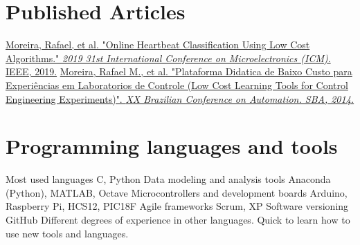 \documentclass[]{cv-style}          %
\begin{document}
\section{Published Articles}
\vspace{-0.3cm}
\begin{entrylist}
\entry
{}
{}
{\vspace{-0.4cm}}
{\href{https://doi.org/10.1109/ICM48031.2019.9021277}{Moreira, Rafael, et al. "Online Heartbeat Classification Using Low Cost Algorithms." \textit{2019 31st International Conference on Microelectronics (ICM)}. IEEE, 2019.}}
{}
\entry
{}
{}
{\vspace{-0.5cm}}
{\href{http://www.swge.inf.br/CBA2014/anais/PDF/1569927865.pdf}{Moreira, Rafael M., et al. "Plataforma Didatica de Baixo Custo para Experiências em Laboratorios de Controle (Low Cost Learning Tools for Control Engineering Experiments)". \textit{XX Brazilian Conference on Automation. SBA, 2014.}}}
{}
\end{entrylist}
{\vspace{-0.4cm}}

\section{Programming languages and tools}
\vspace{-0.3cm}
\begin{entrylist}
\entry
{}
{Most used languages}
{C, Python}
{\vspace{-0.5cm}}
\entry
{}
{Data modeling and analysis tools}
{Anaconda (Python), MATLAB, Octave}
{\vspace{-0.5cm}}
\entry
{}
{Microcontrollers and development boards}
{Arduino, Raspberry Pi, HCS12, PIC18F}
{\vspace{-0.5cm}}
\entry
{}
{Agile frameworks}
{Scrum, XP}
{\vspace{-0.5cm}}
\entry
{}
{Software versioning}
{GitHub}
{\vspace{-0.5cm}}
\entry
{}
{Different degrees of experience in other languages. Quick to learn how to use new tools and languages. }
{}
{\vspace{-4.0cm}}
\end{entrylist}
\end{document}
